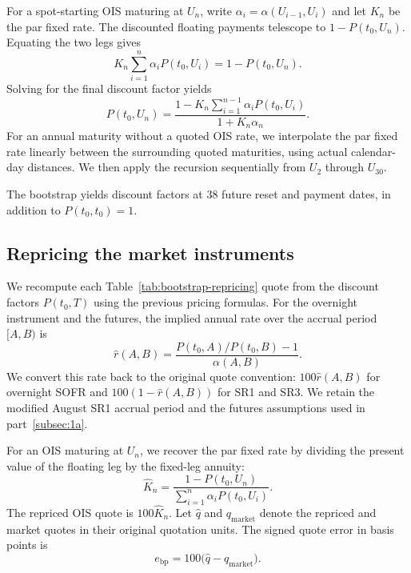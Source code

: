 \documentclass[11pt,a4paper]{article}
\begin{document}
For a spot-starting OIS maturing at \(U_n\), write
\(\alpha_i=\alpha(U_{i-1},U_i)\) and let \(K_n\) be the par
fixed rate. The discounted floating payments telescope to
\(1-P(t_0,U_n)\). Equating the two legs gives
\[
K_n\sum_{i=1}^{n}\alpha_i P(t_0,U_i)=1-P(t_0,U_n).
\]
Solving for the final discount factor yields
\[
P(t_0,U_n)
  = \frac{1-K_n\sum_{i=1}^{n-1}\alpha_i P(t_0,U_i)}
         {1+K_n\alpha_n}.
\]
For an annual maturity without a quoted OIS rate, we interpolate
the par fixed rate linearly between the surrounding quoted
maturities, using actual calendar-day distances. We then apply
the recursion sequentially from \(U_2\) through \(U_{30}\).

The bootstrap yields discount factors at 38 future reset and payment
dates, in addition to \(P(t_0,t_0)=1\). 

\subsection{Repricing the market instruments}\label{subsec:1b}

We recompute each Table~\ref{tab:bootstrap-repricing} quote from the
discount factors \(P(t_0,T)\) using the previous pricing formulas. For the overnight
instrument and the futures, the implied annual rate over the
accrual period \([A,B)\) is
\[
\widehat r(A,B)
  = \frac{P(t_0,A)/P(t_0,B)-1}{\alpha(A,B)}.
\]
We convert this rate back to the original quote convention:
\(100\widehat r(A,B)\) for overnight SOFR and \(100(1-\widehat r(A,B))\)
for SR1 and SR3. We retain the modified August SR1 accrual period
and the futures assumptions used in part~\ref{subsec:1a}.

For an OIS maturing at \(U_n\), we recover the par fixed rate by
dividing the present value of the floating leg by the fixed-leg
annuity:
\[
\widehat K_n
  = \frac{1-P(t_0,U_n)}{\sum_{i=1}^{n}\alpha_i P(t_0,U_i)}.
\]
The repriced OIS quote is \(100\widehat K_n\). Let \(\widehat q\)
and \(q_{\mathrm{market}}\) denote the repriced and market quotes
in their original quotation units. The signed quote error in
basis points is
\[
e_{\mathrm{bp}}=100\bigl(\widehat q-q_{\mathrm{market}}\bigr).
\]
\end{document}
